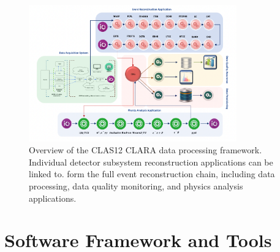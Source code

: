 \begin{figure}[t]
\centering
\includegraphics[width=0.8\textwidth]{pics/clara-overview.pdf}
\caption{Overview of the CLAS12 CLARA data processing framework.  Individual detector subsystem reconstruction applications can be linked to. form the full event reconstruction chain, including  data processing, data quality monitoring, and physics analysis applications.}
\label{fig:clara-overview}
\end{figure}

\section{Software Framework and Tools}\label{sec:framework}


